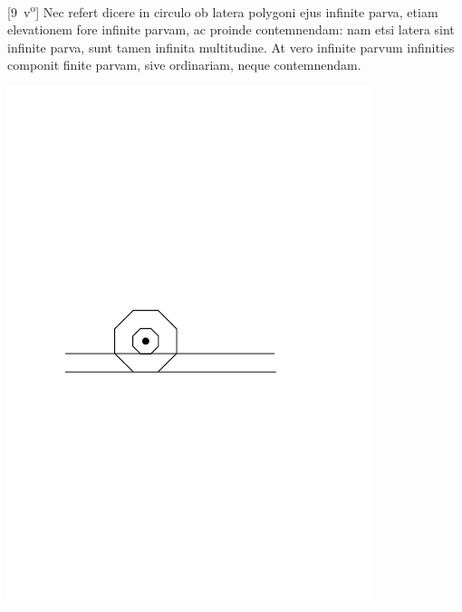[9~v\textsuperscript{o}] Nec refert dicere in circulo ob latera polygoni ejus infinite parva, etiam elevationem\protect{} fore infinite parvam, ac proinde contemnendam: nam etsi latera sint infinite parva, sunt tamen infinita multitudine. At vero infinite parvum infinities  componit finite parvam, sive ordinariam, neque contemnendam.%
\pend
\count{}
\count{}
\pstart 
\vspace{1.5em}
\pend
\vspace{1em}
\pstart \noindent
\begin{minipage}[b] {0.5\textwidth}
 \includegraphics[trim = 0mm 0mm 0mm 0mm, clip, width=0.8\textwidth]{images/lh03705_009r-d4.pdf}
 \vspace{4mm}
\end{minipage}
